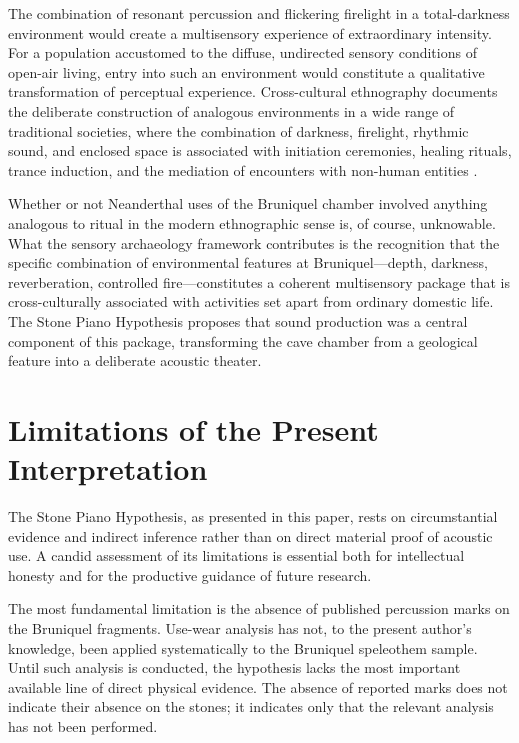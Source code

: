 \documentclass[12pt]{article}
\begin{document}
The combination of resonant percussion and flickering firelight in a total-darkness environment would create a multisensory experience of extraordinary intensity. For a population accustomed to the diffuse, undirected sensory conditions of open-air living, entry into such an environment would constitute a qualitative transformation of perceptual experience. Cross-cultural ethnography documents the deliberate construction of analogous environments in a wide range of traditional societies, where the combination of darkness, firelight, rhythmic sound, and enclosed space is associated with initiation ceremonies, healing rituals, trance induction, and the mediation of encounters with non-human entities \citep{Needham1967, Blacking1973}.

Whether or not Neanderthal uses of the Bruniquel chamber involved anything analogous to ritual in the modern ethnographic sense is, of course, unknowable. What the sensory archaeology framework contributes is the recognition that the specific combination of environmental features at Bruniquel—depth, darkness, reverberation, controlled fire—constitutes a coherent multisensory package that is cross-culturally associated with activities set apart from ordinary domestic life. The Stone Piano Hypothesis proposes that sound production was a central component of this package, transforming the cave chamber from a geological feature into a deliberate acoustic theater.

\section{Limitations of the Present Interpretation}

The Stone Piano Hypothesis, as presented in this paper, rests on circumstantial evidence and indirect inference rather than on direct material proof of acoustic use. A candid assessment of its limitations is essential both for intellectual honesty and for the productive guidance of future research.

The most fundamental limitation is the absence of published percussion marks on the Bruniquel fragments. Use-wear analysis has not, to the present author's knowledge, been applied systematically to the Bruniquel speleothem sample. Until such analysis is conducted, the hypothesis lacks the most important available line of direct physical evidence. The absence of reported marks does not indicate their absence on the stones; it indicates only that the relevant analysis has not been performed.
\end{document}

